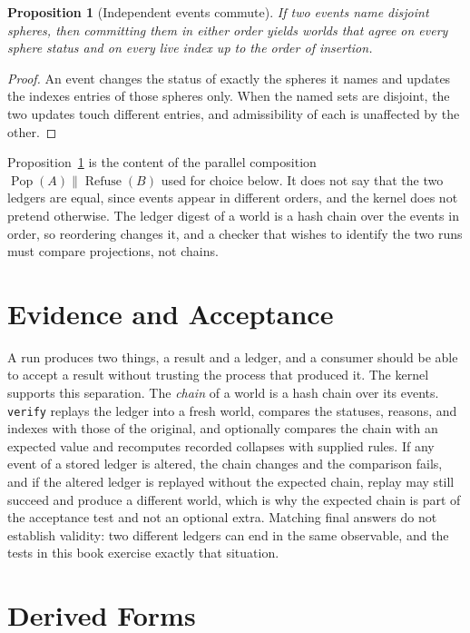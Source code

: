 \documentclass[11pt,oneside]{report}
\newcommand{\Pop}{\operatorname{Pop}}
\newcommand{\Refuse}{\operatorname{Refuse}}
\theoremstyle{plain}
\newtheorem{proposition}{Proposition}[chapter]
\theoremstyle{definition}
\theoremstyle{remark}
\newcommand{\code}[2][Python]{}
\begin{document}
\begin{proposition}[Independent events commute]\label{prop:commute}
If two events name disjoint spheres, then committing them in either order yields worlds that agree on every sphere status and on every live index up to the order of insertion.
\end{proposition}

\begin{proof}
An event changes the status of exactly the spheres it names and updates the indexes entries of those spheres only. When the named sets are disjoint, the two updates touch different entries, and admissibility of each is unaffected by the other.
\end{proof}

Proposition~\ref{prop:commute} is the content of the parallel composition $\Pop(A)\parallel\Refuse(B)$ used for choice below. It does not say that the two ledgers are equal, since events appear in different orders, and the kernel does not pretend otherwise. The ledger digest of a world is a hash chain over the events in order, so reordering changes it, and a checker that wishes to identify the two runs must compare projections, not chains.

\code{ex_kernel_replay}

\section{Evidence and Acceptance}

A run produces two things, a result and a ledger, and a consumer should be able to accept a result without trusting the process that produced it. The kernel supports this separation. The \emph{chain} of a world is a hash chain over its events. \texttt{verify} replays the ledger into a fresh world, compares the statuses, reasons, and indexes with those of the original, and optionally compares the chain with an expected value and recomputes recorded collapses with supplied rules. If any event of a stored ledger is altered, the chain changes and the comparison fails, and if the altered ledger is replayed without the expected chain, replay may still succeed and produce a different world, which is why the expected chain is part of the acceptance test and not an optional extra. Matching final answers do not establish validity: two different ledgers can end in the same observable, and the tests in this book exercise exactly that situation.

\section{Derived Forms}
\end{document}
